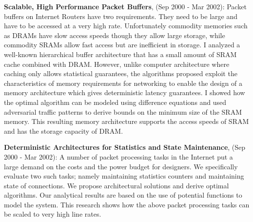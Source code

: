 \documentclass[10pt,a4]{article}
\begin{document}
\begin{small}
\begin{itemize}
\vspace{0.1cm}
{\bf Scalable, High Performance Packet Buffers}, (Sep 2000 - Mar 2002): Packet buffers on
Internet Routers have two requirements. They need to be large and have to be accessed at a very high rate. Unfortunately commodity memories such as
DRAMs have slow access speeds though they allow large storage, while commodity SRAMs allow fast
access but are inefficient in storage. I analyzed a well-known hierarchical buffer architecture
that has a small amount of SRAM cache combined with DRAM. However, unlike computer architecture
where caching only allows statistical guarantees, the algorithms proposed exploit the
characteristics of memory requirements for networking
to enable the design of a memory architecture which gives deterministic latency
guarantees. I showed how the optimal algorithm can be modeled using difference equations and used adversarial 
traffic patterns to derive bounds on the minimum size of the SRAM memory.
This resulting memory architecture supports
the access speeds of SRAM and has the storage capacity of DRAM. 


\vspace{0.1cm}
{\bf Deterministic Architectures for Statistics and State Maintenance}, (Sep 2000 - Mar 2002): A number
of packet processing tasks in the Internet put a large demand on the costs and the power budget for designers. We specifically evaluate two such
tasks; namely maintaining statistics counters and maintaining state of connections. We
propose architectural solutions and derive optimal algorithms. Our analytical results are based on the 
use of potential functions to model the system. This research shows how the above packet processing 
tasks can be scaled to very high line rates.


\end{itemize}
\end{small}
\end{document}
